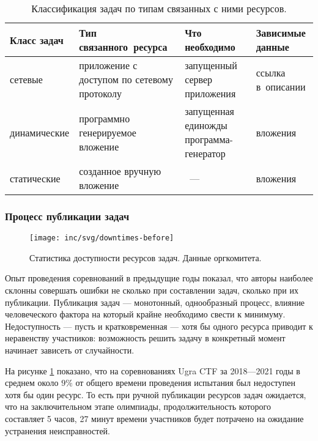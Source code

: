 \begin{longtable}{|p{2.9cm}|p{}|p{}|p{}|}
  \caption{Классификация задач по типам связанных с ними ресурсов.}
  \label{tab:tasks}
  \\ \hline
  \textbf{Класс задач} & \textbf{Тип связанного~ресурса} & \textbf{Что необходимо} & \textbf{Зависимые данные}
  \\ \hline \endhead
  сетевые & приложение с доступом по сетевому протоколу & запущенный сервер приложения & ссылка в~описании
  \\ \hline
  динамические & программно генерируемое вложение & запущенная единожды программа-генератор & вложения
  \\ \hline
  статические & созданное вручную вложение &~--- & вложения
  \\ \hline %
\end{longtable}



\subsubsection{Процесс публикации задач}
\label{cha:the:decl-imper}

\begin{figure}[h!]
  \centering
  \texttt{[image: inc/svg/downtimes-before]}
  \caption{Статистика доступности ресурсов задач. Данные оргкомитета.}
  \label{fig:downtimes-before}
\end{figure}

Опыт проведения соревнований в предыдущие годы показал, что авторы наиболее склонны совершать ошибки не сколько при составлении задач, сколько при их публикации. Публикация задач — монотонный, однообразный процесс, влияние человеческого фактора на который крайне необходимо свести к минимуму. Недоступность — пусть и кратковременная — хотя бы одного ресурса приводит к неравенству участников: возможность решить задачу в конкретный момент начинает зависеть от случайности.

На рисунке \ref{fig:downtimes-before} показано, что на соревнованиях Ugra CTF за 2018---2021 годы в среднем около $9\%$ от общего времени проведения испытания был недоступен хотя бы один ресурс. То есть при ручной публикации ресурсов задач ожидается, что на заключительном этапе олимпиады, продолжительность которого составляет 5 часов, 27 минут времени участников будет потрачено на ожидание устранения неисправностей.

